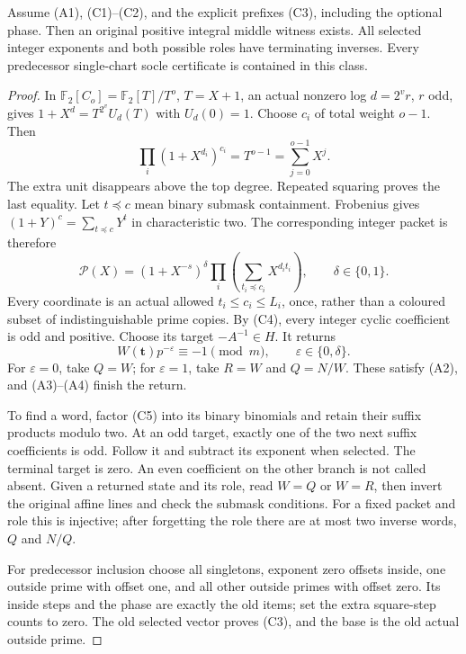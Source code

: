 \begin{theorem}
Assume (A1), (C1)--(C2), and the explicit prefixes (C3), including the optional
phase. Then an original positive integral middle witness exists. All selected
integer exponents and both possible roles have terminating inverses.
Every predecessor single-chart socle certificate is contained in this class.
\end{theorem}
\begin{proof}
In $\mathbb F_2[C_o]=\mathbb F_2[T]/T^o$, $T=X+1$, an actual nonzero log
$d=2^vr$, $r$ odd, gives
$1+X^d=T^{2^v}U_d(T)$ with $U_d(0)=1$.
Choose $c_i$ of total weight $o-1$. Then
\[
 \prod_i(1+X^{d_i})^{c_i}=T^{o-1}=\sum_{j=0}^{o-1}X^j.     \tag{C4}
\]
The extra unit disappears above the top degree. Repeated squaring proves
the last equality.
Let $t\preceq c$ mean binary submask containment. Frobenius gives
$(1+Y)^c=\sum_{t\preceq c}Y^t$ in characteristic two. The corresponding
integer packet is therefore
\[
 \mathcal P(X)= (1+X^{-s})^\delta
      \prod_{i}\left(\sum_{t_i\preceq c_i}X^{d_it_i}\right),
 \qquad \delta\in\{0,1\}.                                \tag{C5}
\]
Every coordinate is an actual allowed $t_i\le c_i\le L_i$, once, rather
than a coloured subset of indistinguishable prime copies. By (C4), every
integer cyclic coefficient is odd and positive. Choose its target
$-A^{-1}\in H$. It returns
\[
 W(\mathbf t)p^{-\varepsilon}\equiv-1\pmod m,
 \qquad \varepsilon\in\{0,\delta\}.                        \tag{C6}
\]
For $\varepsilon=0$, take $Q=W$; for $\varepsilon=1$, take $R=W$ and
$Q=N/W$. These satisfy (A2), and (A3)--(A4) finish the return.

To find a word, factor (C5) into its binary binomials and retain their suffix
products modulo two. At an odd target, exactly one of the two next suffix
coefficients is odd. Follow it and subtract its exponent when selected.
The terminal target is zero. An even coefficient on the other branch is
not called absent. Given a returned state and its role, read $W=Q$ or $W=R$,
then invert the original affine lines and check the submask conditions.
For a fixed packet and role this is injective; after forgetting the role
there are at most two inverse words, $Q$ and $N/Q$.

For predecessor inclusion choose all singletons, exponent zero offsets inside,
one outside prime with offset one, and all other outside primes with offset
zero. Its inside steps and the phase are exactly the old items; set the extra
square-step counts to zero. The old selected vector proves (C3), and the base
is the old actual outside prime.
\end{proof}

